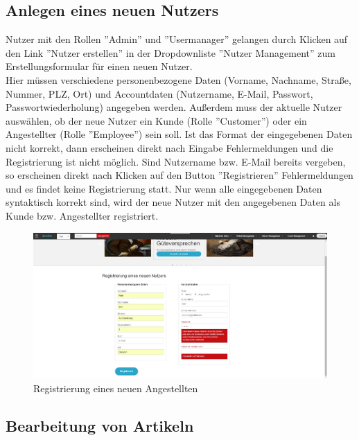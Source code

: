 \documentclass[a4paper]{article}
\begin{document}
\FloatBarrier

\subsection{Anlegen eines neuen Nutzers}

Nutzer mit den Rollen ''Admin'' und ''Usermanager'' gelangen durch Klicken auf den Link ''Nutzer erstellen'' in der Dropdownliste ''Nutzer Management'' zum Erstellungsformular für einen neuen Nutzer. \\
Hier müssen verschiedene personenbezogene Daten (Vorname, Nachname, Straße, Nummer, PLZ, Ort) und Accountdaten (Nutzername, E-Mail, Passwort, Passwortwiederholung) angegeben werden. Außerdem muss der aktuelle Nutzer auswählen, ob der neue Nutzer ein Kunde (Rolle ''Customer'') oder ein Angestellter (Rolle ''Employee'') sein soll. Ist das Format der eingegebenen Daten nicht korrekt, dann erscheinen direkt nach Eingabe Fehlermeldungen und die Registrierung ist nicht möglich. Sind Nutzername bzw. E-Mail bereits vergeben, so erscheinen direkt nach Klicken auf den Button ''Registrieren'' Fehlermeldungen und es findet keine Registrierung statt. Nur wenn alle eingegebenen Daten syntaktisch korrekt sind, wird der neue Nutzer mit den angegebenen Daten als Kunde bzw. Angestellter registriert.

\begin{figure}[ht]
\centering
\includegraphics[width=1.0\textwidth]{NeuerNutzer.jpg}
\caption{Registrierung eines neuen Angestellten}
\end{figure}
\smallskip

\FloatBarrier

\subsection{Bearbeitung von Artikeln} \label{artikeländerung}
\end{document}

